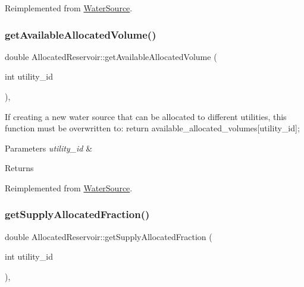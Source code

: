 Reimplemented from \mbox{\hyperlink{classWaterSource_ab3ba86d2a3e864e435ba2b88cceea555_ab3ba86d2a3e864e435ba2b88cceea555}{Water\+Source}}.

\mbox{\label{classAllocatedReservoir_ae161ebfc285aa69cb8b7f4fe20ee7a2e_ae161ebfc285aa69cb8b7f4fe20ee7a2e}} 
\subsubsection{\texorpdfstring{get\+Available\+Allocated\+Volume()}{getAvailableAllocatedVolume()}}
{\footnotesize\ttfamily double Allocated\+Reservoir\+::get\+Available\+Allocated\+Volume (\begin{DoxyParamCaption}\item[{int}]{utility\+\_\+id }\end{DoxyParamCaption})\hspace{0.3cm}{\ttfamily [override]}, {\ttfamily [virtual]}}

If creating a new water source that can be allocated to different utilities, this function must be overwritten to\+: return available\+\_\+allocated\+\_\+volumes\mbox{[}utility\+\_\+id\mbox{]}; 
\begin{DoxyParams}{Parameters}
{\em utility\+\_\+id} & \\
\hline
\end{DoxyParams}
\begin{DoxyReturn}{Returns}

\end{DoxyReturn}


Reimplemented from \mbox{\hyperlink{classWaterSource_a42c687a3be3d88ba38dbea668c8d35cf_a42c687a3be3d88ba38dbea668c8d35cf}{Water\+Source}}.

\mbox{\label{classAllocatedReservoir_a114e9cde6a106b786ca0ed39283cbbed_a114e9cde6a106b786ca0ed39283cbbed}} 
\subsubsection{\texorpdfstring{get\+Supply\+Allocated\+Fraction()}{getSupplyAllocatedFraction()}}
{\footnotesize\ttfamily double Allocated\+Reservoir\+::get\+Supply\+Allocated\+Fraction (\begin{DoxyParamCaption}\item[{int}]{utility\+\_\+id }\end{DoxyParamCaption})\hspace{0.3cm}{\ttfamily [override]}, {\ttfamily [virtual]}}



